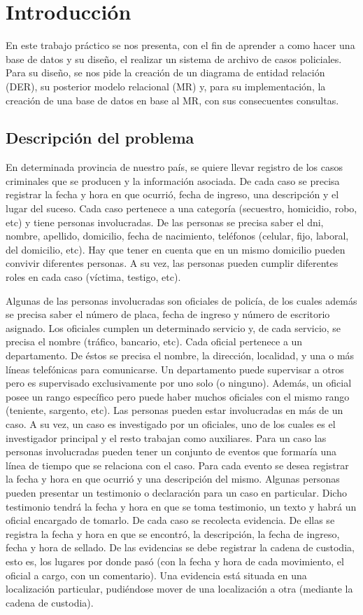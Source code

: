 \section{Introducción}
\noindent En este trabajo práctico se nos presenta, con el fin de aprender a como hacer una base de datos y su diseño, el realizar un sistema de archivo de casos policiales. Para su diseño, se nos pide la creación de un diagrama de entidad relación (DER), su posterior modelo relacional (MR) y, para su implementación, la creación de una base de datos en base al MR, con sus consecuentes consultas.

\subsection{Descripción del problema}
\par En determinada provincia de nuestro país, se quiere llevar registro de los casos criminales que se producen y la información asociada. De cada caso se precisa registrar la fecha y hora en que ocurrió, fecha de ingreso, una descripción y el lugar del suceso. Cada caso pertenece a una categoría (secuestro, homicidio, robo, etc) y tiene personas involucradas. De las personas se precisa saber el dni, nombre, apellido, domicilio, fecha de nacimiento, teléfonos (celular, fijo, laboral, del domicilio, etc). Hay que tener en cuenta que en un mismo domicilio pueden convivir diferentes personas. A su vez, las personas pueden cumplir diferentes roles en cada caso (víctima, testigo, etc).
\par Algunas de las personas involucradas son oficiales de policía, de los cuales además se precisa saber el número de placa, fecha de ingreso y número de escritorio asignado. Los oficiales cumplen un determinado servicio y, de cada servicio, se precisa el nombre (tráfico, bancario, etc). Cada oficial pertenece a un departamento. De éstos se precisa el nombre, la dirección, localidad, y una o más líneas telefónicas para comunicarse. Un departamento puede supervisar a otros pero es supervisado exclusivamente por uno solo (o ninguno). Además, un oficial posee un rango específico pero puede haber muchos oficiales con el mismo rango (teniente, sargento, etc). Las personas pueden estar involucradas en más de un caso. A su vez, un caso es investigado por un oficiales, uno de los cuales es el investigador principal y el resto trabajan como auxiliares. Para un caso las personas involucradas pueden tener un conjunto de eventos que formaría una línea de tiempo que se relaciona con el caso. Para cada evento se desea registrar la fecha y hora en que ocurrió y una descripción del mismo. Algunas personas pueden presentar un testimonio o declaración para un caso en particular. Dicho testimonio tendrá la fecha y hora en que se toma testimonio, un texto y habrá un oficial encargado de tomarlo. De cada caso se recolecta evidencia. De ellas se registra la fecha y hora en que se encontró, la descripción, la fecha de ingreso, fecha y hora de sellado. De las evidencias se debe registrar la cadena de custodia, esto es, los lugares por donde pasó (con la fecha y hora de cada movimiento, el oficial a cargo, con un comentario). Una evidencia está situada en una localización particular, pudiéndose mover de una localización a otra (mediante la cadena de custodia).
